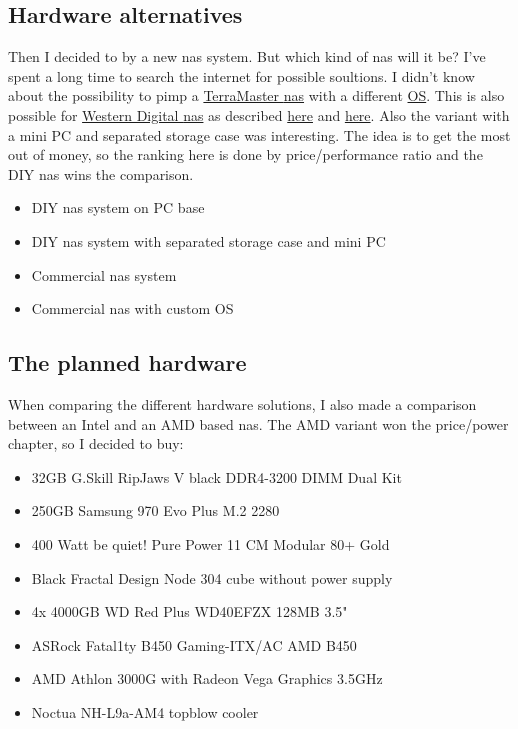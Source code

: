 \subsection{Hardware alternatives}

Then I decided to by a new \gls{nas} system. But which kind of \gls{nas} will
it be? I've spent a long time to search the internet for possible soultions.
I didn't know about the possibility to pimp a \href{https://www.terra-master.com}{TerraMaster \gls{nas}}
with a different \href{https://www.youtube.com/watch?v=f9Fh8XgREJ0}{OS}. This
is also possible for \href{https://www.westerndigital.com}{Western Digital \gls{nas}}
as described \href{https://community.wd.com/t/firmware-freenas-on-pr4100-updated/218730/11}{here}
and \href{https://forum.openmediavault.org/index.php?thread/37009-can-i-install-omv-on-a-wd-nas/}{here}.
Also the variant with a mini PC and separated storage case was interesting. The
idea is to get the most out of money, so the ranking here is done by
price/performance ratio and the DIY \gls{nas} wins the comparison.

\begin{itemize}
    \item DIY \gls{nas} system on PC base
    \item DIY \gls{nas} system with separated storage case and mini PC
    \item Commercial \gls{nas} system
    \item Commercial \gls{nas} with custom OS
\end{itemize}

\subsection{The planned hardware}

When comparing the different hardware solutions, I also made a comparison
between an Intel and an AMD based \gls{nas}. The AMD variant won the price/power
chapter, so I decided to buy:

\begin{itemize}
    \item 32GB G.Skill RipJaws V black DDR4-3200 DIMM Dual Kit
    \item 250GB Samsung 970 Evo Plus M.2 2280
    \item 400 Watt be quiet! Pure Power 11 CM Modular 80+ Gold
    \item Black Fractal Design Node 304 cube without power supply
    \item 4x 4000GB WD Red Plus WD40EFZX 128MB 3.5"
    \item ASRock Fatal1ty B450 Gaming-ITX/AC AMD B450
    \item AMD Athlon 3000G with Radeon Vega Graphics 3.5GHz
    \item Noctua NH-L9a-AM4 topblow cooler
\end{itemize}

